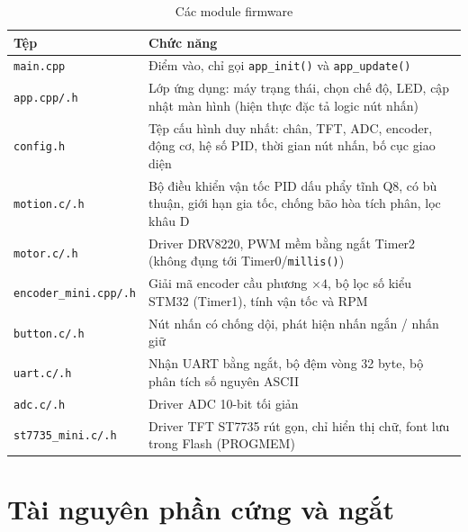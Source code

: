 \begin{table}[H]
\centering\small
\caption{Các module firmware}
\label{tab:modules}
\begin{tabularx}{\linewidth}{@{}l>{\raggedright\arraybackslash}X@{}}
\toprule
\textbf{Tệp} & \textbf{Chức năng}\\
\midrule
\texttt{main.cpp} & Điểm vào, chỉ gọi \texttt{app\_init()} và \texttt{app\_update()}\\
\texttt{app.cpp/.h} & Lớp ứng dụng: máy trạng thái, chọn chế độ, LED, cập nhật màn hình (hiện thực đặc tả logic nút nhấn)\\
\texttt{config.h} & Tệp cấu hình duy nhất: chân, TFT, ADC, encoder, động cơ, hệ số PID, thời gian nút nhấn, bố cục giao diện\\
\texttt{motion.c/.h} & Bộ điều khiển vận tốc PID dấu phẩy tĩnh Q8, có bù thuận, giới hạn gia tốc, chống bão hòa tích phân, lọc khâu D\\
\texttt{motor.c/.h} & Driver DRV8220, PWM mềm bằng ngắt Timer2 (không đụng tới Timer0/\texttt{millis()})\\
\texttt{encoder\_mini.cpp/.h} & Giải mã encoder cầu phương $\times4$, bộ lọc số kiểu STM32 (Timer1), tính vận tốc và RPM\\
\texttt{button.c/.h} & Nút nhấn có chống dội, phát hiện nhấn ngắn / nhấn giữ\\
\texttt{uart.c/.h} & Nhận UART bằng ngắt, bộ đệm vòng 32 byte, bộ phân tích số nguyên ASCII\\
\texttt{adc.c/.h} & Driver ADC 10-bit tối giản\\
\texttt{st7735\_mini.c/.h} & Driver TFT ST7735 rút gọn, chỉ hiển thị chữ, font lưu trong Flash (PROGMEM)\\
\bottomrule
\end{tabularx}
\end{table}

\section{Tài nguyên phần cứng và ngắt}

